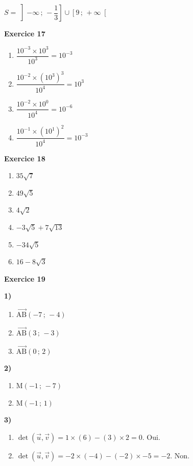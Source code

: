 \documentclass[12pt,a4paper,french]{article}
\begin{document}
\begin{center}
\end{center}
\par\smallskip
\begin{center}$S = \left] -\infty \,;\, - \dfrac{1}{3} \right] \cup \left[ 9 \,;\, +\infty \right[$\end{center}\par\medskip
\medskip

\noindent\textbf{Exercice 17}\par
\smallskip
\begin{enumerate}
\item $\dfrac{10^{-3} \times 10^{3}}{10^{3}} = 10^{-3}$
\item $\dfrac{10^{-2} \times (10^{3})^{3}}{10^{4}} = 10^{3}$
\item $\dfrac{10^{-2} \times 10^{0}}{10^{4}} = 10^{-6}$
\item $\dfrac{10^{-1} \times (10^{1})^{2}}{10^{4}} = 10^{-3}$
\end{enumerate}
\medskip

\noindent\textbf{Exercice 18}\par
\smallskip
\begin{enumerate}
\item $35 \sqrt{7}$
\item $49 \sqrt{5}$
\item $4 \sqrt{2}$
\item $- 3 \sqrt{5} + 7 \sqrt{13}$
\item $- 34 \sqrt{5}$
\item $16 - 8 \sqrt{3}$
\end{enumerate}
\medskip

\noindent\textbf{Exercice 19}\par
\smallskip
\textbf{1)}
\begin{enumerate}
\item $\overrightarrow{\ensuremath{\mathrm{A}}\ensuremath{\mathrm{B}}}(-7\,;\,-4)$
\item $\overrightarrow{\ensuremath{\mathrm{A}}\ensuremath{\mathrm{B}}}(3\,;\,-3)$
\item $\overrightarrow{\ensuremath{\mathrm{A}}\ensuremath{\mathrm{B}}}(0\,;\,2)$
\end{enumerate}
\textbf{2)}
\begin{enumerate}
\item $\ensuremath{\mathrm{M}}\left(-1\,;\,-7\right)$
\item $\ensuremath{\mathrm{M}}\left(-1\,;\,1\right)$
\end{enumerate}
\textbf{3)}
\begin{enumerate}
\item $\det(\vec{u},\vec{v}) = 1\times(6)-(3)\times2 = 0$. Oui.
\item $\det(\vec{u},\vec{v}) = -2\times(-4)-(-2)\times-5 = -2$. Non.
\end{enumerate}
\medskip
\end{document}
